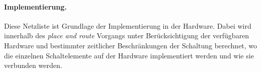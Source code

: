 \paragraph{Implementierung.} Diese Netzliste ist Grundlage der Implementierung in der Hardware. Dabei wird innerhalb des \emph{place and route} Vorgangs unter Berücksichtigung der verfügbaren Hardware und bestimmter zeitlicher Beschränkungen der Schaltung berechnet, wo die einzelnen Schaltelemente auf der Hardware implementiert werden und wie sie verbunden werden.

